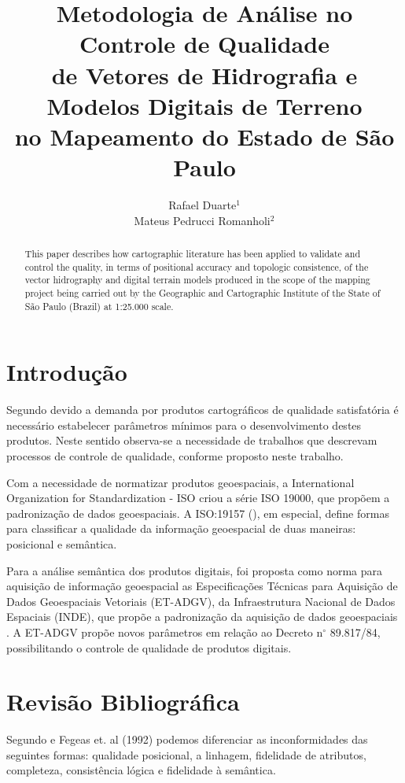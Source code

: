 \documentclass[12pt,a4paper]{article}
\title{Metodologia de Análise no Controle de Qualidade \\ de Vetores de Hidrografia e Modelos Digitais de Terreno\\ no Mapeamento do Estado de São Paulo}
\author{Rafael Duarte$^{1}$ \\ Mateus Pedrucci Romanholi$^2$}
\begin{document}
	\maketitle
	\begin{abstract}
This paper describes how cartographic literature has been applied to validate and control the quality, in terms of positional accuracy and topologic consistence, of the vector hidrography and digital terrain models produced in the scope of the mapping project being carried out by the Geographic and Cartographic Institute of the State of São Paulo (Brazil) at 1:25.000 scale. 
	\end{abstract}

	\section{Introdução}
	\label{sec:paginas}
		Segundo  devido a demanda por produtos cartográficos de
		qualidade satisfatória é necessário estabelecer parâmetros mínimos para o desenvolvimento
		destes produtos. Neste sentido observa-se a necessidade de trabalhos que descrevam processos de controle de qualidade, conforme proposto neste trabalho.
		
		Com a necessidade de normatizar produtos geoespaciais, a International Organization for Standardization - ISO criou a série ISO 19000, que propõem a padronização de dados geoespaciais. A ISO:19157 (\citeyear{ISO19157}), em especial, define formas para classificar a qualidade da informação geoespacial de duas maneiras: posicional e semântica.

		Para a análise semântica dos produtos digitais, foi proposta como norma para aquisição
		de informação geoespacial as Especificações Técnicas para Aquisição de Dados Geoespaciais Vetoriais (ET-ADGV), da Infraestrutura Nacional de Dados Espaciais (INDE), que propõe a padronização da
		aquisição de dados geoespaciais \cite{de2011especificaccao}. A ET-ADGV propõe novos parâmetros em relação
		ao Decreto n$^{\circ}$ 89.817/84, possibilitando o controle de qualidade de produtos digitais.
				
		\section{Revisão Bibliográfica}
		
	    Segundo  e Fegeas et. al (1992) podemos diferenciar as inconformidades das seguintes formas: qualidade posicional, a linhagem, fidelidade de atributos, completeza, consistência lógica e fidelidade à semântica.
		
\end{document}
